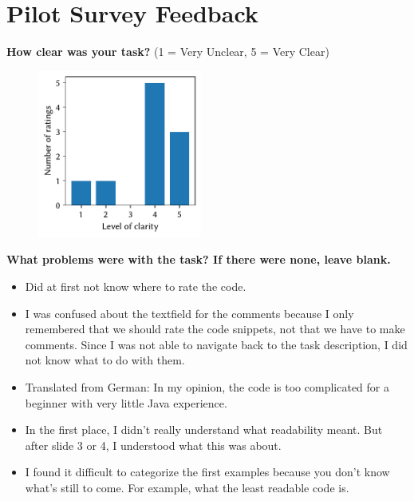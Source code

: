 \documentclass[%
class=scrreprt,
chapterprefix=false,%
open=right,%
twoside=true,%
paper=a4,%
logofile={Logo\_zentral\_farbig\_EN.png},%
thesistype=master,%
UKenglish,%
]{se2thesis}
\theoremstyle{definition}
\begin{document}
\printbibliography	

\appendix
	
\chapter{Pilot Survey Feedback}\label{appendix:pilot-survey-feedback}

	\textbf{How clear was your task?} (1 = Very Unclear, 5 = Very Clear)
	\begin{figure}[h!]
		\centering
		\includegraphics[width=0.48\textwidth]{img/pilot_survey_task_clearness.pdf}
		\label{fig:pilot-task-clear}
	\end{figure}
	
	\textbf{What problems were with the task? If there were none, leave blank.}
	\begin{itemize}
		\item Did at first not know where to rate the code.
		\item I was confused about the textfield for the comments because I only remembered that we should rate the code snippets, not that we have to make comments. Since I was not able to navigate back to the task description, I did not know what to do with them.
		\item Translated from German: In my opinion, the code is too complicated for a beginner with very little Java experience.
		\item In the first place, I didn't really understand what readability meant. But after slide 3 or 4, I understood what this was about.
		\item I found it difficult to categorize the first examples because you don't know what's still to come. For example, what the least readable code is.
	\end{itemize}
\end{document}
